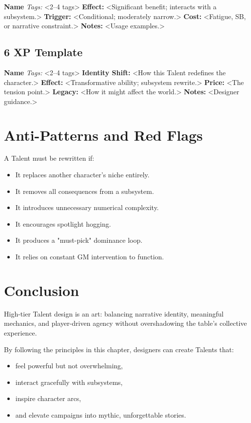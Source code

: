 \documentclass[11pt]{book}
\begin{document}
\textbf{Name}  
\emph{Tags:} <2--4 tags>  
\textbf{Effect:} <Significant benefit; interacts with a subsystem.>  
\textbf{Trigger:} <Conditional; moderately narrow.>  
\textbf{Cost:} <Fatigue, SB, or narrative constraint.>  
\textbf{Notes:} <Usage examples.>

\subsection{6 XP Template}

\textbf{Name}  
\emph{Tags:} <2--4 tags>  
\textbf{Identity Shift:} <How this Talent redefines the character.>  
\textbf{Effect:} <Transformative ability; subsystem rewrite.>  
\textbf{Price:} <The tension point.>  
\textbf{Legacy:} <How it might affect the world.>  
\textbf{Notes:} <Designer guidance.>

\section{Anti-Patterns and Red Flags}

A Talent must be rewritten if:

\begin{itemize}
    \item It replaces another character's niche entirely.
    \item It removes all consequences from a subsystem.
    \item It introduces unnecessary numerical complexity.
    \item It encourages spotlight hogging.
    \item It produces a "must-pick" dominance loop.
    \item It relies on constant GM intervention to function.
\end{itemize}

\section{Conclusion}

High-tier Talent design is an art:
balancing narrative identity, meaningful mechanics,
and player-driven agency without overshadowing the table's collective experience.

By following the principles in this chapter,
designers can create Talents that:
\begin{itemize}
    \item feel powerful but not overwhelming,
    \item interact gracefully with subsystems,
    \item inspire character arcs,
    \item and elevate campaigns into mythic, unforgettable stories.
\end{itemize}
\end{document}
